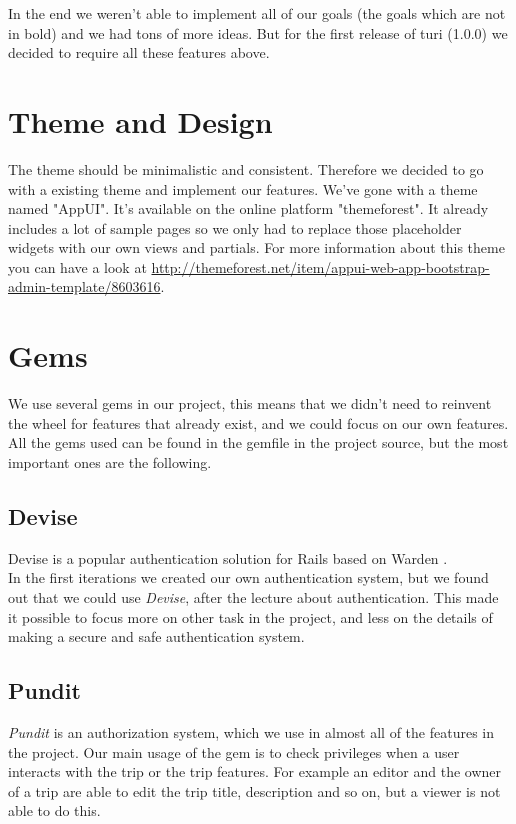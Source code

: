 \documentclass[a4paper]{article}
\begin{document}
\noindent
In the end we weren't able to implement all of our goals (the goals which are not in bold) and we had tons of more ideas. But for the first release of turi (1.0.0) we decided to require all these features above.\\

\section{Theme and Design}
The theme should be minimalistic and consistent. Therefore we decided to go with a existing theme and implement our features. We've gone with a theme named "AppUI". It's available on the online platform "themeforest". It already includes a lot of sample pages so we only had to replace those placeholder widgets with our own views and partials. For more information about this theme you can have a look at \url{http://themeforest.net/item/appui-web-app-bootstrap-admin-template/8603616}.

\section{Gems}
We use several gems in our project, this means that we didn't need to reinvent the wheel for features that already exist, and we could focus on our own features. All the gems used can be found in the gemfile in the project source, but the most important ones are the following.
\subsection{Devise}
Devise is a popular authentication solution for Rails based on Warden \cite{devise}. \\
In the first iterations we created our own authentication system, but we found out that we could use \textit{Devise}, after the lecture about authentication. This made it possible to focus more on other task in the project, and less on the details of making a secure and safe authentication system. 

\subsection{Pundit}
\textit{Pundit} is an authorization system\cite{pundit}, which we use in almost all of the features in the project. Our main usage of the gem is to check privileges when a user interacts with the trip or the trip features. For example an editor and the owner of a trip are able to edit the trip title, description and so on, but a viewer is not able to do this. 
\end{document}
